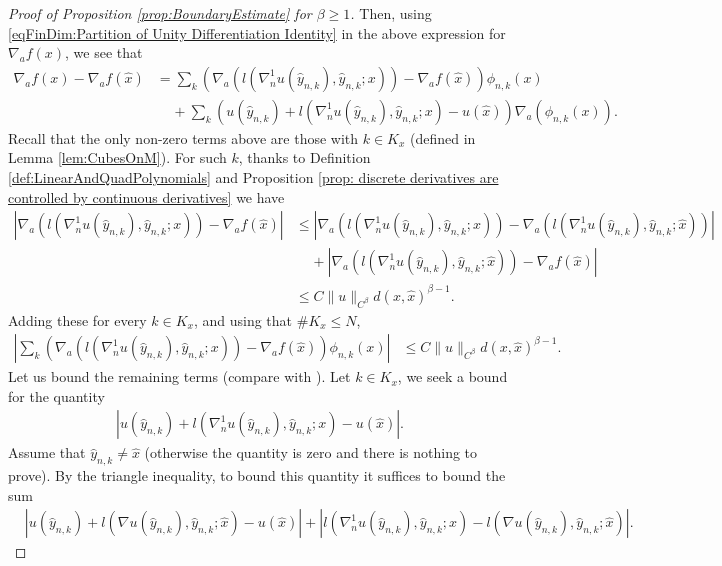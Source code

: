 \documentclass[11pt,reqno]{amsart}
\numberwithin{equation}{section}
\theoremstyle{plain}
\begin{document}
\begin{proof}[Proof of Proposition \ref{prop:BoundaryEstimate} for $\beta\geq 1$]
    Then, using \eqref{eqFinDim:Partition of Unity Differentiation Identity} in the above expression for $\nabla_a f(x)$, we see that
    \begin{align*}
      \nabla_{a}f(x)-\nabla_{a}f(\hat x)  & = \sum \limits_{k} \left ( \nabla_a \left ( l( \nabla^1_n u (\hat y_{n,k}),\hat y_{n,k};x)\right ) -\nabla_{a}f(\hat x)\right )\phi_{n,k}(x)\\
  	& \;\;\;\;+\sum \limits_{k} \left (u(\hat y_{n,k})+l( \nabla^1_n u (\hat y_{n,k}),\hat y_{n,k};x)-u(\hat x)\right )\nabla_a \left ( \phi_{n,k}(x) \right ).	
    \end{align*}
    Recall that the only non-zero terms above are those with $k\in K_x$ (defined in Lemma \ref{lem:CubesOnM}). For such $k$, thanks to Definition \ref{def:LinearAndQuadPolynomials} and Proposition \ref{prop: discrete derivatives are controlled by continuous derivatives} we have 
    \begin{align*}
      |\nabla_a \left ( l( \nabla^1_n u (\hat y_{n,k}),\hat y_{n,k};x)\right ) -\nabla_{a}f(\hat x)| & \leq |\nabla_a \left ( l( \nabla^1_n u (\hat y_{n,k}),\hat y_{n,k};x)\right )-\nabla_a \left ( l( \nabla^1_n u (\hat y_{n,k}),\hat y_{n,k};\hat x)\right )|\\
  	& \;\;\;\;+|\nabla_a \left ( l( \nabla^1_n u (\hat y_{n,k}),\hat y_{n,k};\hat x)\right )-\nabla_{a}f(\hat x)|\\
  	& \leq C\|u\|_{C^\beta}d(x,\hat x)^{\beta-1}.
    \end{align*}
    Adding these for every $k\in K_x$, and using that $\#K_x\leq N$,	
    \begin{align}
      \left | \sum \limits_{k} \left ( \nabla_a \left ( l( \nabla^1_n u (\hat y_{n,k}),\hat y_{n,k};x)\right ) -\nabla_{a}f(\hat x)\right )\phi_{n,k}(x)\right | & \leq C\|u\|_{C^\beta}d(x,\hat x)^{\beta-1}.\label{eqFinDimApp:boundary estimate beta larger than 1 first term}
    \end{align}	  	
    Let us bound the remaining terms (compare with \cite[Chp 6, Sec 2.3.2]{Stei-71}). Let $k \in K_x$, we seek a bound for the quantity
    \begin{align*}
      |u(\hat y_{n,k})+l(\nabla^1_nu(\hat y_{n,k}),\hat y_{n,k};x)-u(\hat x)|.		
    \end{align*}			
    Assume that $\hat y_{n,k}\neq \hat x$ (otherwise the quantity is zero and there is nothing to prove). By the triangle inequality, to bound this quantity it suffices to bound the sum
    \begin{align*}
      & |u(\hat y_{n,k})+l(\nabla u(\hat y_{n,k}),\hat y_{n,k};\hat x)-u(\hat x)|+|l(\nabla^1_nu(\hat y_{n,k}),\hat y_{n,k};x)-l(\nabla u(\hat y_{n,k}),\hat y_{n,k};\hat x)|.	  

\end{align*}
\end{proof}
\end{document}
